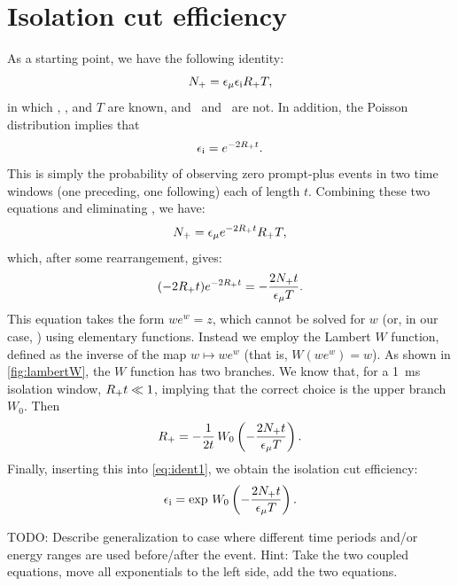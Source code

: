 \documentclass[../thesis.tex]{subfiles}
\begin{document}

\section{Isolation cut efficiency}
\label{sec:isolcuteff}

As a starting point, we have the following identity:
\begin{equation}
  \label{eq:ident0}
  N_\mathrm{+} = \epsilon_\mathrm{\mu} \epsilon_\mathrm{i} R_\mathrm{+} T,
\end{equation}
in which \Nplu, \emu, and $T$ are known, and \eisol\ and \Rplu\ are not. In
addition, the Poisson distribution implies that
\begin{equation}
  \label{eq:ident1}
  \epsilon_\mathrm{i} = e^{-2R_\mathrm{+} t}.
\end{equation}
This is simply the probability of observing zero prompt-plus events in two time
windows (one preceding, one following) each of length $t$. Combining these two
equations and eliminating \eisol, we have:
\begin{equation}
  N_\mathrm{+} = \epsilon_\mathrm{\mu} e^{-2R_\mathrm{+} t} R_\mathrm{+} T,
\end{equation}
which, after some rearrangement, gives:
\begin{equation}
  (-2 R_\mathrm{+} t) e^{-2 R_\mathrm{+} t} = - \frac{2 N_\mathrm{+} t}{\epsilon_\mathrm{\mu} T}.
\end{equation}
This equation takes the form $we^w = z$, which cannot be solved for $w$ (or, in
our case, \Rplu) using elementary functions. Instead we employ the Lambert $W$
function, defined as the inverse of the map $w \mapsto we^w$ (that is, $W(we^w)
= w$). As shown in \autoref{fig:lambertW}, the $W$ function has two branches.
We know that, for a 1~ms isolation window, $R_\mathrm{+} t \ll 1$, implying that the
correct choice is the upper branch $W_0$. Then
\begin{equation}
  R_\mathrm{+} = -\frac{1}{2t}\, W_0 \left(-\frac{2N_\mathrm{+} t}{\epsilon_\mathrm{\mu} T}\right).
\end{equation}
Finally, inserting this into \eqref{eq:ident1}, we obtain the isolation cut
efficiency:
\begin{equation}
  \epsilon_\mathrm{i} = \exp \, W_0 \left( -\frac{2N_\mathrm{+} t}{\epsilon_\mathrm{\mu} T} \right).
\end{equation}

TODO: Describe generalization to case where different time periods and/or energy
ranges are used before/after the event. Hint: Take the two coupled equations,
move all exponentials to the left side, add the two equations.
\end{document}
